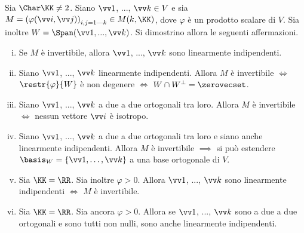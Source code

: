 \documentclass[11pt]{article}
\begin{document}
	\begin{exercise} Sia $\Char \KK \neq 2$.
		Siano $\vv1$, ..., $\vv k \in V$ e sia $M = \left( \varphi(\vv i, \vv j) \right)_{i, j = 1\textrm{---}k} \in M(k, \KK)$,
		dove $\varphi$ è un prodotto scalare di $V$. Sia inoltre $W = \Span(\vv 1, ..., \vv k)$. Si dimostrino
		allora le seguenti affermazioni.
		
		\begin{enumerate}[(i)]
			\item Se $M$ è invertibile, allora $\vv 1$, ..., $\vv k$ sono linearmente indipendenti.
			
			\item Siano $\vv 1$, ..., $\vv k$ linearmente indipendenti. Allora $M$ è invertibile $\iff$ $\restr{\varphi}{W}$ è non degenere $\iff$ $W \cap W^\perp = \zerovecset$.
			
			\item Siano $\vv1$, ..., $\vv k$ a due a due ortogonali tra loro. Allora $M$ è invertibile $\iff$ nessun
			vettore $\vv i$ è isotropo.
			
			\item Siano $\vv1$, ..., $\vv k$ a due a due ortogonali tra loro e siano anche linearmente indipendenti.
			Allora $M$ è invertibile $\implies$ si può estendere $\basis_W = \{\vv 1, \ldots, \vv k\}$ a una base ortogonale di $V$.
			
			\item Sia $\KK = \RR$. Sia inoltre $\varphi > 0$. Allora $\vv 1$, ..., $\vv k$ sono linearmente
			indipendenti $\iff$ $M$ è invertibile.
			
			\item Sia $\KK = \RR$. Sia ancora $\varphi > 0$. Allora se $\vv 1$, ..., $\vv k$ sono a due a due
			ortogonali e sono tutti non nulli, sono anche linearmente indipendenti.
		\end{enumerate}
	\end{exercise}
\end{document}
